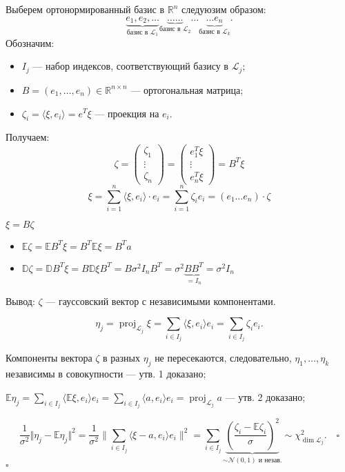 \documentclass[12pt]{report}
\renewenvironment{proof}{{\bfseries Доказательство:}}{$\square$\\\\}
\theoremstyle{definition}
\begin{document}
\begin{proof}
	Выберем ортонормированный базис в $\mathbb{R}^n$ следуюзим образом:
	$$ \underbrace{e_1, e_2, \dots}_{\text{базис в }\mathcal{L}_1} \underbrace{\dots\dots}_{\text{базис в }\mathcal{L}_2} \dots \underbrace{\dots e_n}_{\text{базис в }\mathcal{L}_k}. $$
	Обозначим:
	\begin{itemize}
		\item $I_j$ — набор индексов, соответствующий базису в $\mathcal{L}_j$;
		\item $B = (e_1, \dots, e_n) \in \mathbb{R}^{n \times n}$ — ортогональная матрица;
		\item $\zeta_i = \langle\xi, e_i\rangle = e^T \xi$ — проекция на $e_i$.
	\end{itemize}

	Получаем:
	$$ \zeta = \begin{pmatrix} \zeta_1 \\ \vdots \\ \zeta_n \end{pmatrix} = \begin{pmatrix} e_1^T \xi \\ \vdots \\ e_n^T\xi \end{pmatrix} = B^T\xi $$
	$$ \xi = \sum_{i=1}^n \langle \xi, e_i \rangle \cdot e_i = \sum_{i=1}^n \zeta_ie_i = (e_1 \dots e_n)\cdot \zeta $$

	$\xi = B\zeta$
	\begin{itemize}
		\item $\mathbb{E}\zeta = \mathbb{E}B^T\xi = B^T\mathbb{E}\xi = B^Ta$
		\item $\mathbb{D}\zeta = \mathbb{D}B^T\xi = B\mathbb{D}\xi B^T = B\sigma^2I_nB^T = \sigma^2 \underbrace{BB^T}_{=I_n} = \sigma^2I_n$
	\end{itemize}

	Вывод: $\zeta$ — гауссовский вектор с независимыми компонентами.

	$$ \eta_j = \operatorname{proj}_{\mathcal{L}_j} \xi = \sum_{i \in I_j} \langle \xi, e_i \rangle e_i = \sum_{i \in I_j} \zeta_i e_i. $$

	Компоненты вектора $\zeta$ в разных $\eta_j$ не пересекаются, следовательно, $\eta_1, \dots, \eta_k$ независимы в совокупности — утв. 1 доказано;

	$\mathbb{E}\eta_j = \displaystyle\sum_{i \in I_j} \langle \mathbb{E}\xi, e_i \rangle e_i = \sum_{i \in I_j} \langle a, e_i \rangle e_i = \operatorname{proj}_{\mathcal{L}_j}a$ — утв. 2 доказано;

	$$ \dfrac{1}{\sigma^2}\Vert \eta_j - \mathbb{E}\eta_j \Vert^2 = \dfrac{1}{\sigma^2} \bigg\rVert \sum_{i \in I_j} \langle\xi - a, e_i \rangle e_i \bigg\rVert^2 = \sum_{i \in I_j} \underbrace{\left(\dfrac{\zeta_i - \mathbb{E}\zeta_i}{\sigma}\right)^2}_{\sim \mathcal{N}(0, 1) \text{ и незав.}} \sim \chi^2_{\dim \mathcal{L}_j}. \quad \square $$
\end{proof}
\end{document}
